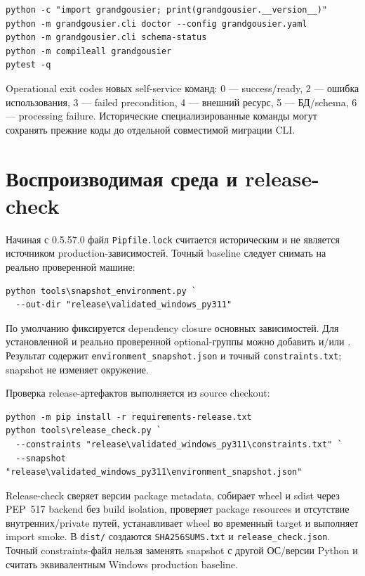 \begin{lstlisting}
python -c "import grandgousier; print(grandgousier.__version__)"
python -m grandgousier.cli doctor --config grandgousier.yaml
python -m grandgousier.cli schema-status
python -m compileall grandgousier
pytest -q
\end{lstlisting}

Operational exit codes новых self-service команд: 0 --- success/ready, 2 --- ошибка использования, 3 --- failed precondition, 4 --- внешний ресурс, 5 --- БД/schema, 6 --- processing failure. Исторические специализированные команды могут сохранять прежние коды до отдельной совместимой миграции CLI.

\section{Воспроизводимая среда и release-check}

Начиная с 0.5.57.0 файл \texttt{Pipfile.lock} считается историческим и не является источником production-зависимостей. Точный baseline следует снимать на реально проверенной машине:

\begin{lstlisting}
python tools\snapshot_environment.py `
  --out-dir "release\validated_windows_py311"
\end{lstlisting}

По умолчанию фиксируется dependency closure основных зависимостей. Для установленной и реально проверенной optional-группы можно добавить  и/или . Результат содержит \texttt{environment\_snapshot.json} и точный \texttt{constraints.txt}; snapshot не изменяет окружение.

Проверка release-артефактов выполняется из source checkout:

\begin{lstlisting}
python -m pip install -r requirements-release.txt
python tools\release_check.py `
  --constraints "release\validated_windows_py311\constraints.txt" `
  --snapshot "release\validated_windows_py311\environment_snapshot.json"
\end{lstlisting}

Release-check сверяет версии package metadata, собирает wheel и sdist через PEP~517 backend без build isolation, проверяет package resources и отсутствие внутренних/private путей, устанавливает wheel во временный target и выполняет import smoke. В \texttt{dist/} создаются \texttt{SHA256SUMS.txt} и \texttt{release\_check.json}. Точный constraints-файл нельзя заменять snapshot с другой ОС/версии Python и считать эквивалентным Windows production baseline.


